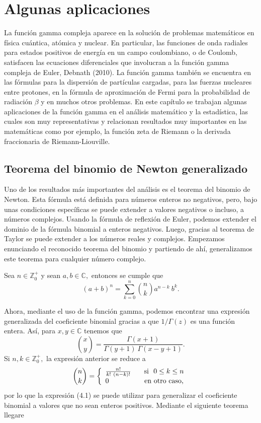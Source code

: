 %
\chapter{Algunas aplicaciones}
La función gamma compleja aparece en la solución de problemas matemáticos en física cuántica, atómica y nuclear. En particular, las funciones de onda radiales para estados positivos de energía en un campo coulombiano, o de Coulomb, satisfacen las ecuaciones diferenciales que involucran a la función gamma compleja de Euler, Debnath (2010). La función gamma también se encuentra en las fórmulas para la dispersión de partículas cargadas, para las fuerzas nucleares entre protones, en la fórmula de aproximación de Fermi para la probabilidad de radiación $\beta$ y en muchos otros problemas. En este capítulo se trabajan algunas aplicaciones de la función gamma en el análisis matemático y la estadística, las cuales son muy representativas y relacionan resultados muy importantes en las matemáticas como por ejemplo, la función zeta de Riemann o la derivada fraccionaria de Riemann-Liouville.

\section{Teorema del binomio de Newton generalizado}
Uno de los resultados más importantes del análisis es el teorema del binomio de Newton. Esta fórmula está definida para números enteros no negativos, pero, bajo unas condiciones específicas se puede extender a valores negativos o incluso, a números complejos. Usando la fórmula de reflexión de Euler, podemos extender el dominio de la fórmula binomial a enteros negativos. Luego, gracias al teorema de Taylor se puede extender a los números reales y complejos. Empezamos enunciando el reconocido teorema del binomio y partiendo de ahí, generalizamos este teorema para cualquier número complejo.

\begin{theorem}
	Sea $n \in \mathbb{Z}^+_0$ y sean $a,b \in \mathbb{C},$ entonces se cumple que $$(a+b)^n = \sum_{k = 0}^{n}\binom{n}{k}a^{n-k}\ b^k.$$
\end{theorem}
Ahora, mediante el uso de la función gamma, podemos encontrar una expresión generalizada del coeficiente binomial gracias a que $1/\Gamma(z)$ es una función entera. Así, para $x,y \in \mathbb{C}$ tenemos que 
\begin{equation}
	\binom{x}{y} = \frac{\Gamma(x+1)}{\Gamma(y+1)\ \Gamma(x-y+1)}.
\end{equation} Si $n,k \in \mathbb{Z}^+_0,$ la expresión anterior se reduce a \[
\binom{n}{k} = \left\{ \begin{array}{lcl}
	\frac{n!}{k!\ (n-k)!}\hspace{0.3cm}&\textrm{si }\ 0 \leq k \leq n\\
	0 &\text{en otro caso,}
\end{array}\right.\] por lo que la expresión (4.1) se puede utilizar para generalizar el coeficiente binomial a valores que no sean enteros positivos. Mediante el siguiente teorema llegare
\endinput